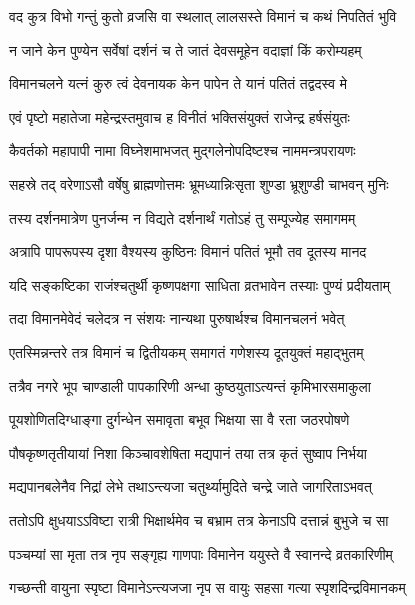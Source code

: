 \twolineshloka
{वद कुत्र विभो गन्तुं कुतो व्रजसि वा स्थलात्}
{लालसस्ते विमानं च कथं निपतितं भुवि} %

\twolineshloka
{न जाने केन पुण्येन सर्वेषां दर्शनं च ते}
{जातं देवसमूहेन वदाज्ञां किं करोम्यहम्} %

\twolineshloka
{विमानचलने यत्नं कुरु त्वं देवनायक}
{केन पापेन ते यानं पतितं तद्वदस्व मे} %

\twolineshloka
{एवं पृष्टो महातेजा महेन्द्रस्तमुवाच ह}
{विनीतं भक्तिसंयुक्तं राजेन्द्र हर्षसंयुतः} %


\twolineshloka
{कैवर्तको महापापी नामा विघ्नेशमाभजत्}
{मुद्गलेनोपदिष्टश्च नाममन्त्रपरायणः} %

\twolineshloka
{सहस्रे तद् वरेणाऽसौ वर्षेषु ब्राह्मणोत्तमः}
{भ्रूमध्यान्निःसृता शुण्डा भ्रूशुण्डी चाभवन् मुनिः} %

\twolineshloka
{तस्य दर्शनमात्रेण पुनर्जन्म न विद्यते}
{दर्शनार्थं गतोऽहं तु सम्पूज्येह समागमम्} %

\twolineshloka
{अत्रापि पापरूपस्य दृशा वैश्यस्य कुष्ठिनः}
{विमानं पतितं भूमौ तव दूतस्य मानद} %

\twolineshloka
{यदि सङ्कष्टिका राजंश्चतुर्थी कृष्णपक्षगा}
{साधिता व्रतभावेन तस्याः पुण्यं प्रदीयताम्} %

\twolineshloka
{तदा विमानमेवेदं चलेदत्र न संशयः}
{नान्यथा पुरुषार्थश्च विमानचलनं भवेत्} %

\twolineshloka
{एतस्मिन्नन्तरे तत्र विमानं च द्वितीयकम्}
{समागतं गणेशस्य दूतयुक्तं महाद्भुतम्} %

\twolineshloka
{तत्रैव नगरे भूप चाण्डाली पापकारिणी}
{अन्धा कुष्ठयुताऽत्यन्तं कृमिभारसमाकुला} %

\twolineshloka
{पूयशोणितदिग्धाङ्गा दुर्गन्धेन समावृता}
{बभूव भिक्षया सा वै रता जठरपोषणे} %

\twolineshloka
{पौषकृष्णतृतीयायां निशा किञ्चावशेषिता}
{मद्यपानं तया तत्र कृतं सुष्वाप निर्भया} %

\twolineshloka
{मद्यपानबलेनैव निद्रां लेभे तथाऽन्त्यजा}
{चतुर्थ्यामुदिते चन्द्रे जाते जागरिताऽभवत्} %

\twolineshloka
{ततोऽपि क्षुधयाऽऽविष्टा रात्री भिक्षार्थमेव च}
{बभ्राम तत्र केनाऽपि दत्तान्नं बुभुजे च सा} %

\twolineshloka
{पञ्चम्यां सा मृता तत्र नृप सङ्गृह्य गाणपाः}
{विमानेन ययुस्ते वै स्वानन्दे व्रतकारिणीम्} %

\twolineshloka
{गच्छन्ती वायुना स्पृष्टा विमानेऽन्त्यजजा नृप}
{स वायुः सहसा गत्या स्पृशदिन्द्रविमानकम्} %

